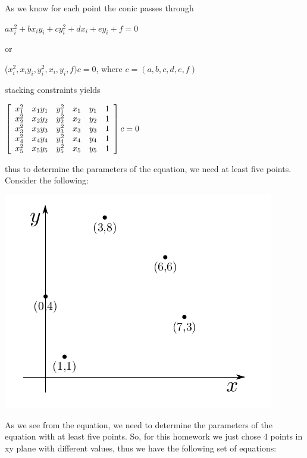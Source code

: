 \documentclass[]{article}
\begin{document}
As we know for each point the conic passes through

\centerline {$ax_{i}^2 + bx_{i}y_{i} + cy_{i}^2 + dx_{i} + ey_{i} + f = 0$ }

\vspace{0.4em}

or 

\centerline {
	($x_{i}^2, x_{i}y_{i}, y_{i}^2, x_{i}, y_{i}, f)c = 0$, where $c = (a,b,c,d,e,f)$ 
}

stacking constraints yields 


\centerline {
	$\left[ {\begin{array}{*{20}c}
		x_1^2 & x_1y_1 & y_1^2 & x_1 & y_1 & 1 \\
		x_2^2 & x_2y_2 & y_2^2 & x_2 & y_2 & 1 \\
		x_3^2 & x_3y_3 & y_3^2 & x_3 & y_3 & 1 \\
		x_4^2 & x_4y_4 & y_4^2 & x_4 & y_4 & 1 \\
		x_5^2 & x_5y_5 & y_5^2 & x_5 & y_5 & 1 
		\end{array} } \right]c = 0$	
}



thus to determine the parameters of the equation, we need at least five points. Consider the following: 

\centerline {
	\includegraphics[scale=0.5]{scr2}
}

As we see from the equation, we need to determine the parameters of the equation with at least five points. So, for this homework we just chose 4 points in xy plane with different values, thus we have the following set of equations:
\end{document}
